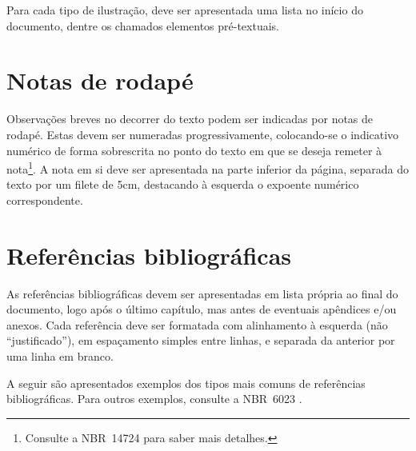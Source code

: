 \documentclass{ifsultcc}
\begin{document}
Para cada tipo de ilustração, deve ser apresentada uma lista no início do documento, dentre os chamados elementos pré-textuais.

\section{Notas de rodapé}
Observações breves no decorrer do texto podem ser indicadas por notas de rodapé.  Estas devem ser numeradas progressivamente, colocando-se o indicativo numérico de forma sobrescrita no ponto do texto em que se deseja remeter à nota\footnote{Consulte a NBR~14724 para saber mais detalhes.}.  A nota em si deve ser apresentada na parte inferior da página, separada do texto por um filete de 5cm, destacando à esquerda o expoente numérico correspondente.

\section{Referências bibliográficas}
As referências bibliográficas devem ser apresentadas em lista própria ao final do documento, logo após o último capítulo, mas antes de eventuais apêndices e/ou anexos.  Cada referência deve ser formatada com alinhamento à esquerda (não ``justificado''), em espaçamento simples entre linhas, e separada da anterior por uma linha em branco.

A seguir são apresentados exemplos dos tipos mais comuns de referências bibliográficas.  Para outros exemplos, consulte a NBR~6023 \cite{NBR6023:2002}.
\end{document}
